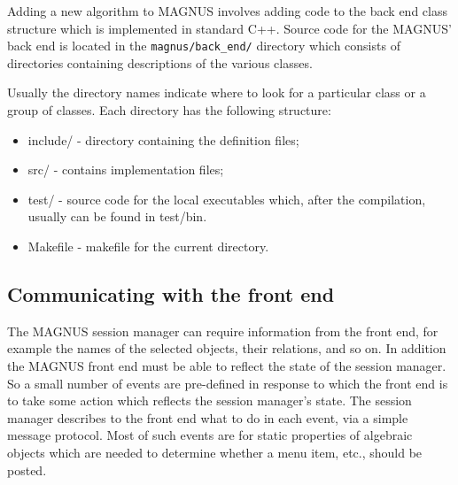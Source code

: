\documentclass[12pt]{article}
\def\magnus{MAGNUS }
\def\nsmagnus{MAGNUS}
\begin{document}
Adding a new algorithm to \magnus involves adding code to the back end
class structure  which  is implemented  in standard C++.
Source code for the \nsmagnus' back end is located in
the {\tt magnus/back\_end/} directory
which consists of directories containing descriptions of the various classes.



Usually the directory names indicate where to look for a particular
class or a group of classes. Each directory has the following structure:
\begin{itemize}
\item include/ - directory containing the definition files;
\item src/ - contains implementation files;
\item test/ -  source code for the local executables which, after the
compilation,
usually can be found in test/bin.
\item Makefile - makefile for the current directory.
\end{itemize}

\subsection{Communicating with the front end}
The \magnus session manager can require information from
the front end, for example the names of the selected objects, their relations,
and so on.  In addition the \magnus front end must be able to
reflect the state
of the session manager.  So a small number of events are pre-defined
in response to
which the front end is to take some action which reflects the session manager's
state. The session manager describes to the front end what to do in each event,
via a simple message  protocol.
Most of such events  are for static properties of algebraic objects which
are needed to determine whether a menu item, etc., should be posted.
\end{document}
